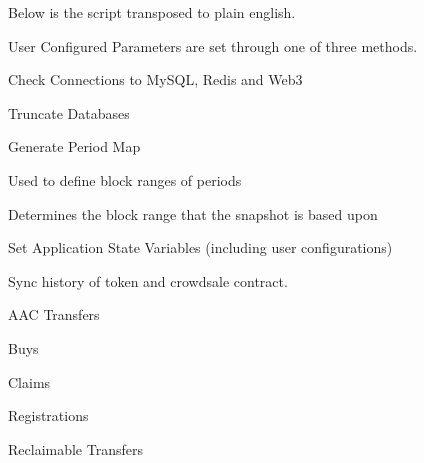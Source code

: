 Below is the script transposed to plain english.


\begin{DoxyEnumerate}
\item User Configured Parameters are set through one of three methods.
\item Check Connections to My\+S\+QL, Redis and Web3
\item Truncate Databases
\item Generate Period Map
\begin{DoxyEnumerate}
\item Used to define block ranges of periods
\item Determines the block range that the snapshot is based upon
\end{DoxyEnumerate}
\item Set Application State Variables (including user configurations)
\end{DoxyEnumerate}
\begin{DoxyEnumerate}
\item Sync history of token and crowdsale contract.
\begin{DoxyEnumerate}
\item A\+AC Transfers
\item Buys
\item Claims
\item Registrations
\item Reclaimable Transfers
\end{DoxyEnumerate}
\end{DoxyEnumerate}
